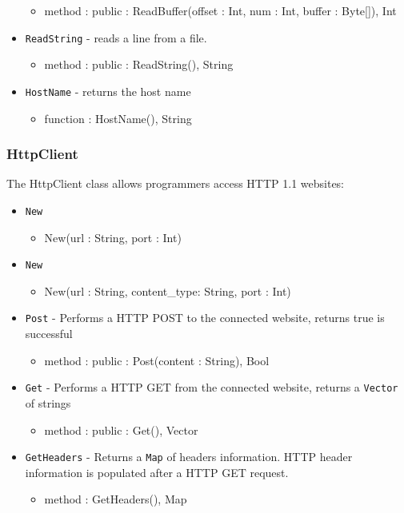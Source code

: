 \documentclass[12pt]{article}
\begin{document}
\begin{itemize}
\begin{itemize}
	\item method : public : ReadBuffer(offset : Int, num : Int, buffer : Byte[]), Int
	\end{itemize}
    \item \texttt{ReadString} - reads a line from a file.
    	\begin{itemize}
	\item method : public : ReadString(), String
	\end{itemize}
    \item \texttt{HostName} - returns the host name
    	\begin{itemize}
	\item function : HostName(), String
	\end{itemize}
\end{itemize}

\subsubsection{HttpClient}
The HttpClient class allows programmers access HTTP 1.1 websites:
\begin{itemize}
    \item \texttt{New}
    	\begin{itemize}
	\item New(url : String, port : Int)
	\end{itemize}
    \item \texttt{New}
    	\begin{itemize}
	\item New(url : String, content\_type: String, port : Int)
	\end{itemize}
    \item \texttt{Post} - Performs a HTTP POST to the connected website, returns true is successful
    	\begin{itemize}
	\item method : public : Post(content : String), Bool
	\end{itemize}
    \item \texttt{Get} - Performs a HTTP GET from the connected website, returns a \texttt{Vector} of strings
    	\begin{itemize}
	\item method : public : Get(), Vector
	\end{itemize}
    \item \texttt{GetHeaders} - Returns a \texttt{Map} of headers information.  HTTP header information is populated after a HTTP GET request.
    	\begin{itemize}
	\item method : GetHeaders(), Map
	\end{itemize}
\end{itemize}
\end{document}
